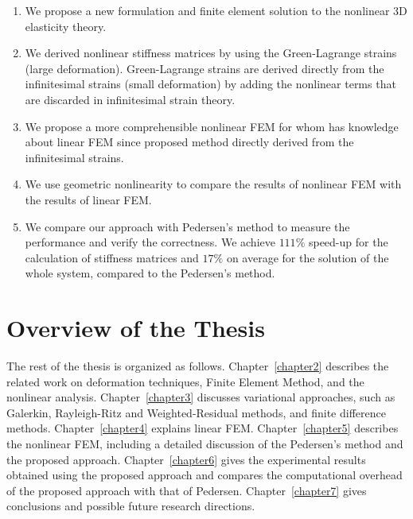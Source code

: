 \begin{enumerate}
\item We propose a new formulation and finite element solution to the nonlinear 3D elasticity theory.
\item We derived nonlinear stiffness matrices by using the Green-Lagrange strains (large deformation). Green-Lagrange strains are derived directly from the infinitesimal strains (small deformation) by adding the nonlinear terms that are discarded in infinitesimal strain theory.
\item We propose a more comprehensible nonlinear FEM for whom has knowledge about linear FEM since proposed method directly derived from the infinitesimal strains.
\item We use geometric nonlinearity to compare the results of nonlinear FEM with the results of linear FEM.
\item We compare our approach with Pedersen's method to measure the performance and verify the correctness. We achieve $111\%$ speed-up for the calculation of stiffness matrices and $17\%$ on average for the solution of the whole system, compared to the Pedersen's method.
\end{enumerate}



\section{Overview of the Thesis}

The rest of the thesis is organized as follows. Chapter~\ref{chapter2} describes the related work on deformation techniques, Finite Element Method, and the nonlinear analysis. Chapter~\ref{chapter3} discusses variational approaches, such as Galerkin, Rayleigh-Ritz and Weighted-Residual methods, and finite difference methods. Chapter~\ref{chapter4} explains linear FEM. Chapter~\ref{chapter5} describes the nonlinear FEM, including a detailed discussion of the Pedersen's method and the proposed approach. Chapter~\ref{chapter6} gives the experimental results obtained using the proposed approach and compares the computational overhead of the proposed approach with that of Pedersen. Chapter~\ref{chapter7} gives conclusions and possible future research directions.

